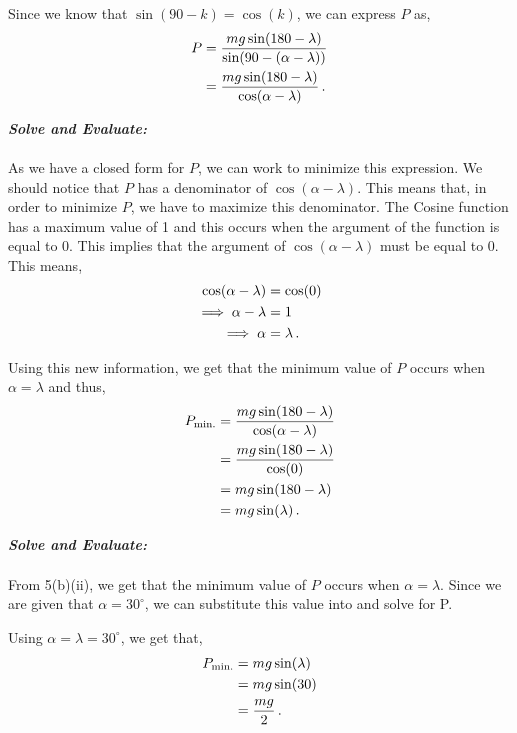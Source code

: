 \begin{subquestions}
\begin{subsubquestions}
	Since we know that $\sin(90-k)=\cos(k)$, we can express $P$ as,
	\begin{align}
		P & = \frac{mg\sin(180-\lambda)}{\sin(90-(\alpha-\lambda))} \nonumber \\
		& = \frac{mg\sin(180-\lambda)}{\cos(\alpha-\lambda)} \,.
	\end{align}
	
	\textbf{\textit{Solve and Evaluate:}} \\ \\
	As we have a closed form for $P$, we can work to minimize this expression. We should notice that $P$ has a denominator of $\cos(\alpha - \lambda)$. This means that, in order to minimize $P$, we have to maximize this denominator. The Cosine function has a maximum value of 1 and this occurs when the argument of the function is equal to 0. This implies that the argument of $\cos(\alpha - \lambda)$ must be equal to 0. This means,
	\begin{align}
		\cos(\alpha - \lambda) & = \cos(0) \nonumber \\
		\implies \alpha - \lambda & = 1 \nonumber \\
		\implies \alpha & = \lambda \,.
	\end{align}
	
	Using this new information, we get that the minimum value of $P$ occurs when $\alpha=\lambda$ and thus,
	\begin{align}
		P_{\text{min.}} & = \frac{mg\sin(180-\lambda)}{\cos(\alpha-\lambda)} \nonumber \\
		& = \frac{mg\sin(180-\lambda)}{\cos(0)} \nonumber \\
		& = mg\sin(180-\lambda) \nonumber \\
		& = mg\sin(\lambda) \,. \label{2014:q5:MinP}
	\end{align}
	
	
	\subsubquestion
	
	\textbf{\textit{Solve and Evaluate:}} \\ \\
	From 5(b)(ii), we get that the minimum value of $P$ occurs when $\alpha=\lambda$. Since we are given that $\alpha=30^\circ$, we can substitute this value into  and solve for P.
	
	Using $\alpha=\lambda=30^\circ$, we get that,
	\begin{align}
		P_{\text{min.}} & = mg\sin(\lambda) \nonumber \\
		& = mg\sin(30) \nonumber \\
		& = \frac{mg}{2} \,.
	\end{align}
	
\end{subsubquestions}

\end{subquestions}